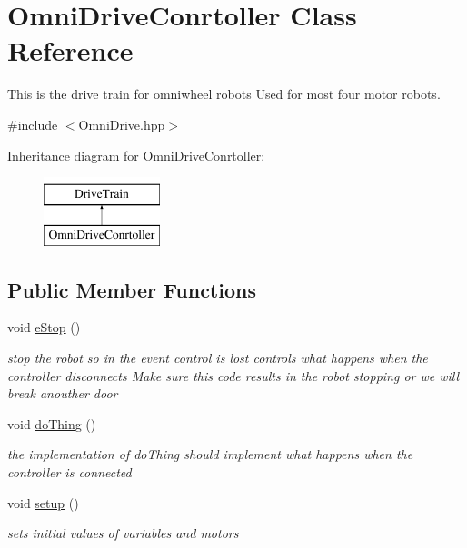 \hypertarget{class_omni_drive_conrtoller}{}\section{Omni\+Drive\+Conrtoller Class Reference}
\label{class_omni_drive_conrtoller}


This is the drive train for omniwheel robots Used for most four motor robots.  




{\ttfamily \#include $<$Omni\+Drive.\+hpp$>$}

Inheritance diagram for Omni\+Drive\+Conrtoller\+:\begin{figure}[H]
\begin{center}
\leavevmode
\includegraphics[height=2.000000cm]{class_omni_drive_conrtoller}
\end{center}
\end{figure}
\subsection*{Public Member Functions}
\begin{DoxyCompactItemize}
\item 
\mbox{\label{class_omni_drive_conrtoller_afa3633aa507f94725e2708e64812fc0d}} 
void \mbox{\hyperlink{class_omni_drive_conrtoller_afa3633aa507f94725e2708e64812fc0d}{e\+Stop}} ()
\begin{DoxyCompactList}\small\item\em stop the robot so in the event control is lost controls what happens when the controller disconnects Make sure this code results in the robot stopping or we will break anouther door \end{DoxyCompactList}\item 
\mbox{\label{class_omni_drive_conrtoller_a49df2da45a491575eaeed3ed08e6c06b}} 
void \mbox{\hyperlink{class_omni_drive_conrtoller_a49df2da45a491575eaeed3ed08e6c06b}{do\+Thing}} ()
\begin{DoxyCompactList}\small\item\em the implementation of do\+Thing should implement what happens when the controller is connected \end{DoxyCompactList}\item 
\mbox{\label{class_omni_drive_conrtoller_a5cc239719ab846de89fbb9709f7a65c2}} 
void \mbox{\hyperlink{class_omni_drive_conrtoller_a5cc239719ab846de89fbb9709f7a65c2}{setup}} ()
\begin{DoxyCompactList}\small\item\em sets initial values of variables and motors \end{DoxyCompactList}\end{DoxyCompactItemize}
